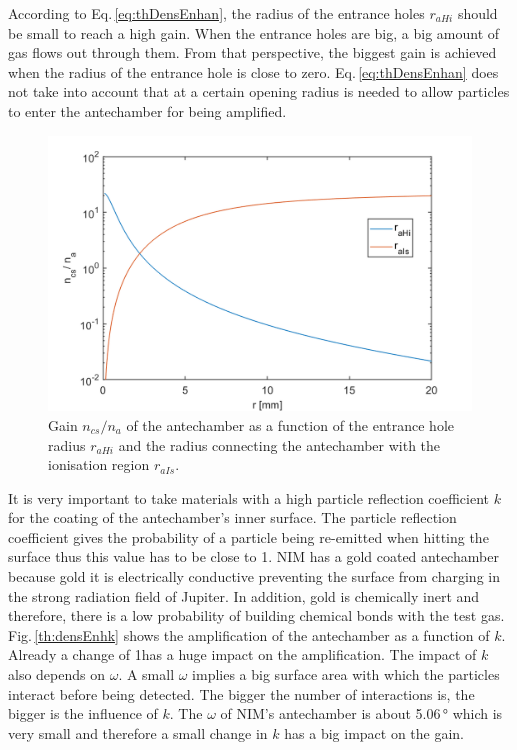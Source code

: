 	According to Eq.\,\eqref{eq:thDensEnhan}, the radius of the entrance holes $r_{aHi}$ should be small to reach a high gain. When the entrance holes are big, a big amount of gas flows out through them. From that perspective, the biggest gain is achieved when the radius of the entrance hole is close to zero. Eq.\,\eqref{eq:thDensEnhan} does not take into account that at a certain opening radius is needed to allow particles to enter the antechamber for being amplified.\\
	\begin{figure}[h!] %
		\centering
		\includegraphics[width= .7\textwidth]{Bilder/raHi_raIs.png}
		\caption{Gain $n_{cs}/n_a$ of the antechamber as a function of the entrance hole radius $r_{aHi}$ and the radius connecting the antechamber with the ionisation region $r_{aIs}$.}
		\label{th:densEnhraHiraIs}
	\end{figure}
	It is very important to take materials with a high particle reflection coefficient $k$ for the coating of the antechamber's inner surface. The particle reflection coefficient gives the probability of a particle being re-emitted when hitting the surface thus this value has to be close to 1. NIM has a gold coated antechamber because gold it is electrically conductive preventing the surface from charging in the strong radiation field of Jupiter. In addition, gold is chemically inert and therefore, there is a low probability of building chemical bonds with the test gas. Fig.\,\ref{th:densEnhk} shows the amplification of the antechamber as a function of $k$. Already a change of 1\textperthousand  has a huge impact on the amplification. The impact of $k$ also depends on $\omega$. A small $\omega$ implies a big surface area with which the particles interact before being detected. The bigger the number of interactions is, the bigger is the influence of $k$. The $\omega$ of NIM's antechamber is about 5.06\,\si{\degree} which is very small and therefore a small change in $k$ has a big impact on the gain.\\
